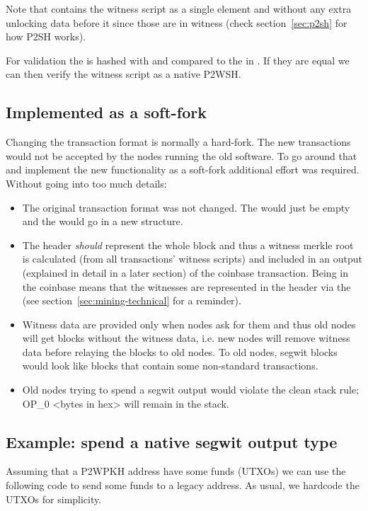 Note that  contains the witness script as a single element and without any extra unlocking data before it since those are in witness (check section~\ref{sec:p2sh} for how P2SH works).

For validation the  is hashed with  and compared to the  in . If they are equal we can then verify the witness script as a native P2WSH.


\subsection*{Implemented as a soft-fork}
Changing the transaction format is normally a hard-fork. The new transactions would not be accepted by the nodes running the old software. To go around that and implement the new functionality as a soft-fork additional effort was required. Without going into too much details:

\begin{itemize}
\item The original transaction format was not changed. The  would just be empty and the  would go in a new structure.
\item The header \emph{should} represent the whole block and thus a witness merkle root is calculated (from all transactions' witness scripts) and included in an  output (explained in detail in a later section) of the coinbase transaction. Being in the coinbase means that the witnesses are represented in the header via the  (see section~\ref{sec:mining-technical} for a reminder).
\item Witness data are provided only when nodes ask for them and thus old nodes will get blocks without the witness data, i.e. new nodes will remove witness data before relaying the blocks to old nodes. To old nodes, segwit blocks would look like blocks that contain some non-standard transactions.
\item Old nodes trying to spend a segwit output would violate the clean stack rule; OP\_0 <bytes in hex> will remain in the stack.
\end{itemize}


\subsection*{Example: spend a native segwit output type}
Assuming that a P2WPKH address have some funds (UTXOs) we can use the following code to send some funds to a legacy address. As usual, we hardcode the UTXOs for simplicity.

